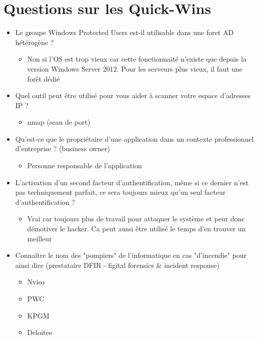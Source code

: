 \documentclass[a4paper]{article}
\begin{document}
\section{Questions sur les Quick-Wins}
\begin{itemize}[label=\textbullet, font=\Large]
  \item Le groupe Windows Protected Users est-il utilisable dans une foret AD hétérogène ?
  \begin{itemize}[label=, font=\scriptsize]
    \item Non si l'OS est trop vieux car cette fonctionnaité n'existe que depuis la version Windows Server 2012. Pour les serveurs plus vieux, il faut une forêt dédié
  \end{itemize}
  \item Quel outil peut être utilisé pour vous aider à scanner votre espace d'adresses IP ?
  \begin{itemize}[label=, font=\scriptsize]
    \item nmap (scan de port)
  \end{itemize}
  \item Qu'est-ce que le propriétaire d'une application dans un contexte professionnel d'entreprise ? (business owner)
  \begin{itemize}[label=, font=\scriptsize]
    \item Personne responsable de l'application
  \end{itemize}
  \item  L'activation d'un second facteur d'authentification, même si ce dernier n'est pas techniquement parfait, ce sera toujours mieux qu'un seul facteur d'authentification ?
  \begin{itemize}[label=, font=\scriptsize]
    \item Vrai car toujours plus de travail pour attaquer le système et peur donc démotiver le hacker. Ca peut aussi être utilisé le temps d'en trouver un meilleur
  \end{itemize}
  \item Connaître le nom des "pompiers" de l'informatique en cas "d'incendie" pour ainsi dire (prestataire DFIR - figital forensics \& incident response)
  \begin{itemize}[label=, font=\scriptsize]
    \item Nviso
    \item PWC
    \item KPGM
    \item Deloitee

\end{itemize}
\end{itemize}
\end{document}
